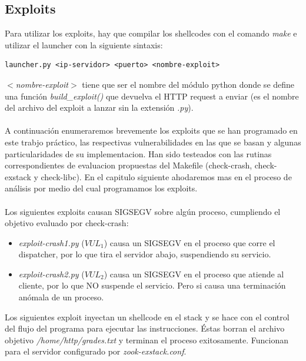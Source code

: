 \documentclass[12pt]{article}
\begin{document}
\subsection{Exploits}
Para utilizar los exploits, hay que compilar los shellcodes con el comando \textit{make} e utilizar el launcher con la siguiente sintaxis:
\begin{lstlisting}
launcher.py <ip-servidor> <puerto> <nombre-exploit>
\end{lstlisting}
\textit{$<$nombre-exploit$>$} tiene que ser el nombre del módulo python donde se define una función \textit{build\_exploit()} que devuelva el HTTP request a enviar (es el nombre del archivo del exploit a lanzar sin la extensión \textit{.py}). \\ \\
A continuación enumeraremos brevemente los exploits que se han programado en este trabjo práctico, las respectivas vulnerabilidades en las que se basan y algunas particularidades de su implementacion. Han sido testeados con las rutinas correspondientes de evaluacion propuestas del Makefile (check-crash, check-exstack y check-libc). En el capitulo siguiente ahodaremos mas en el proceso de análisis por medio del cual programamos los exploits. \\ \\
Los siguientes exploits causan SIGSEGV sobre algún proceso, cumpliendo el objetivo evaluado por check-crash:
\begin{itemize}
\item  \textit{exploit-crash1.py} ($VUL_1$) causa un SIGSEGV en el proceso que corre el dispatcher, por lo que tira el servidor abajo, suspendiendo su servicio.
\item  \textit{exploit-crash2.py} ($VUL_2$) causa un SIGSEGV en el proceso que atiende al cliente, por lo que NO suspende el servicio. Pero si causa una terminación anómala de un proceso.
\end{itemize}
Los siguientes exploit inyectan un shellcode en el stack y se hace con el control del flujo del programa para ejecutar las instrucciones. Éstas borran el archivo objetivo \textit{/home/http/grades.txt} y terminan el proceso exitosamente. Funcionan para el servidor configurado por \textit{zook-exstack.conf}.
\end{document}
